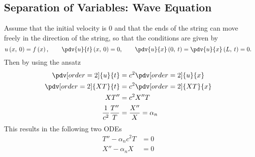 \documentclass{article}
\begin{document}
\subsection{Separation of Variables: Wave Equation}
Assume that the initial velocity is 0 and that the ends of the string
can move freely in the direction of the string, so that the conditions
are given by
\begin{equation*}
    u\left( x,\: 0 \right) = f\left( x \right), \quad \quad \pdv{u}{t} \left( x,\: 0 \right) = 0, \quad \quad \pdv{u}{x} \left( 0,\: t \right) = \pdv{u}{x} \left( L,\: t \right) = 0.
\end{equation*}
Then by using the ansatz
\begin{align*}
    \pdv[order=2]{u}{t}         & = c^2\pdv[order=2]{u}{x}   \\
    \pdv[order=2]{XT}{t}        & = c^2\pdv[order=2]{XT}{x}  \\
    XT''                        & = c^2X''T                  \\
    \frac{1}{c^2} \frac{T''}{T} & = \frac{X''}{X} = \alpha_n
\end{align*}
This results in the following two ODEs
\begin{align*}
    T'' - \alpha_n c^2 T & = 0 \\
    X'' - \alpha_n X     & = 0
\end{align*}
\end{document}
